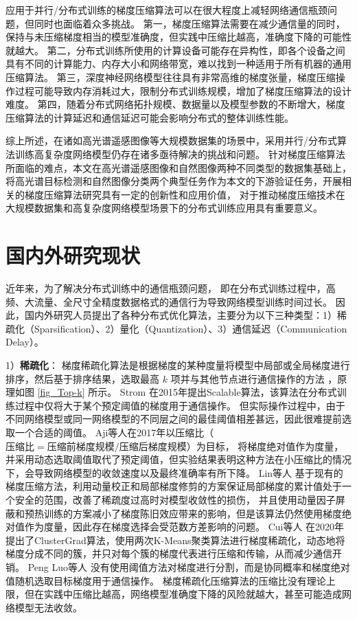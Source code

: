 \documentclass{xdupgthesis}
\begin{document}
应用于并行/分布式训练的梯度压缩算法可以在很大程度上减轻网络通信瓶颈问题，但同时也面临着众多挑战。
第一，梯度压缩算法需要在减少通信量的同时，保持与未压缩梯度相当的模型准确度，但实践中压缩比越高，准确度下降的可能性就越大。
第二，分布式训练所使用的计算设备可能存在异构性，即各个设备之间具有不同的计算能力、内存大小和网络带宽，难以找到一种适用于所有机器的通用压缩算法。
第三，深度神经网络模型往往具有非常高维的梯度张量，梯度压缩操作过程可能导致内存消耗过大，限制分布式训练规模，增加了梯度压缩算法的设计难度。
第四，随着分布式网络拓扑规模、数据量以及模型参数的不断增大，梯度压缩算法的计算延迟和通信延迟可能会影响分布式的整体训练性能。

综上所述，在诸如高光谱遥感图像等大规模数据集的场景中，采用并行/分布式算法训练高复杂度网络模型仍存在诸多亟待解决的挑战和问题。
针对梯度压缩算法所面临的难点，本文在高光谱遥感图像和自然图像两种不同类型的数据集基础上，
将高光谱目标检测和自然图像分类两个典型任务作为本文的下游验证任务，开展相关的梯度压缩算法研究具有一定的创新性和应用价值，
对于推动梯度压缩技术在大规模数据集和高复杂度网络模型场景下的分布式训练应用具有重要意义。


\section{国内外研究现状}

近年来，为了解决分布式训练中的通信瓶颈问题，
即在分布式训练过程中，高频、大流量、全尺寸全精度数据格式的通信行为导致网络模型训练时间过长。
因此，国内外研究人员提出了各种分布式优化算法，主要分为以下三种类型：1）稀疏化（Sparsification）、2）量化（Quantization）、3）通信延迟（Communication Delay）。

1）\textbf{稀疏化}：
梯度稀疏化算法是根据梯度的某种度量将模型中局部或全局梯度进行排序，然后基于排序结果，选取最高 $k$ 项并与其他节点进行通信操作的方法 \cite{wangni2018gradient} \cite{wang2018atomo}，原理如图 \ref{fig_Top-k} 所示。
Strom \cite{strom2015scalable}在2015年提出Scalable算法，该算法在分布式训练过程中仅将大于某个预定阈值的梯度用于通信操作。
但实际操作过程中，由于不同网络模型或同一网络模型的不同层之间的最佳阈值相差甚远，因此很难提前选取一个合适的阈值\cite{stich2018sparsified}。
Aji等人\cite{aji2017sparse}在2017年以压缩比（$\mbox{压缩比}= \mbox{压缩前梯度规模} / \mbox{压缩后梯度规模}$）为目标，
将梯度绝对值作为度量，并采用动态选取阈值取代了预定阈值，但实验结果表明这种方法在小压缩比的情况下，会导致网络模型的收敛速度以及最终准确率有所下降。
Lin等人 \cite{lin2017deep}基于现有的梯度压缩方法，利用动量校正和局部梯度修剪的方案保证局部梯度的累计值处于一个安全的范围，改善了稀疏度过高时对模型收敛性的损伤，
并且使用动量因子屏蔽和预热训练的方案减小了梯度陈旧效应带来的影响，但是该算法仍然使用梯度绝对值作为度量，因此存在梯度选择会受范数方差影响的问题。
Cui等人 \cite{cui2020clustergrad}在2020年提出了ClusterGrad算法，使用两次K-Means聚类算法进行梯度稀疏化，动态地将梯度分成不同的簇，并只对每个簇的梯度代表进行压缩和传输，从而减少通信开销。
Peng Luo等人 \cite{luo2021novel}没有使用阈值方法对梯度进行分割，而是协同概率和梯度绝对值随机选取目标梯度用于通信操作。
梯度稀疏化压缩算法的压缩比没有理论上限，但在实践中压缩比越高，网络模型准确度下降的风险就越大，甚至可能造成网络模型无法收敛。
\end{document}
